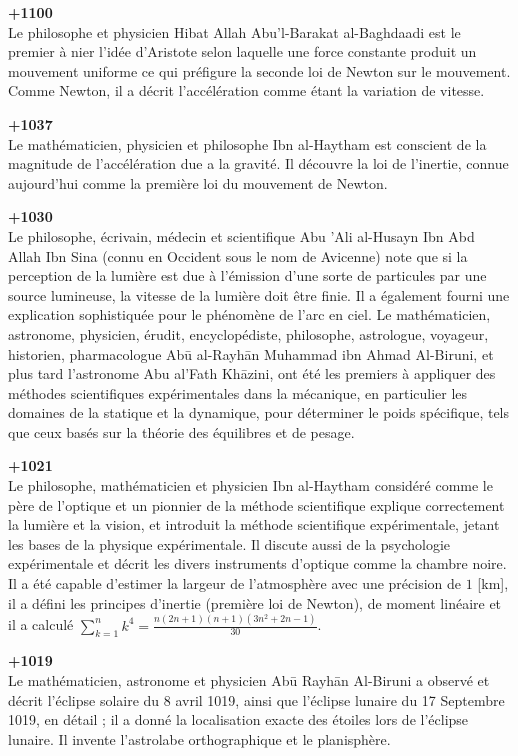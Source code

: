\textbf{+1100}\\
Le philosophe et physicien Hibat Allah Abu'l-Barakat al-Baghdaadi est le premier à nier l'idée d'Aristote selon laquelle une force constante produit un mouvement uniforme ce qui préfigure la seconde loi de Newton sur le mouvement. Comme Newton, il a décrit l'accélération comme étant la variation de vitesse.

\textbf{+1037}\\
Le mathématicien, physicien et philosophe Ibn al-Haytham est conscient de la magnitude de l'accélération due a la gravité. Il découvre la loi de l'inertie, connue aujourd'hui comme la première loi du mouvement de Newton.

\textbf{+1030}\\
Le philosophe, écrivain, médecin et scientifique Abu 'Ali al-Husayn Ibn Abd Allah Ibn Sina (connu en Occident sous le nom de Avicenne) note que si la perception de la lumière est due à l'émission d'une sorte de particules par une source lumineuse, la vitesse de la lumière doit être finie. Il a également fourni une explication sophistiquée pour le phénomène de l'arc en ciel.  Le mathématicien, astronome, physicien, érudit, encyclopédiste, philosophe, astrologue, voyageur, historien, pharmacologue Abū al-Rayhān Muhammad ibn Ahmad  Al-Biruni, et plus tard l'astronome Abu al'Fath Khāzini, ont été les premiers à appliquer des méthodes scientifiques expérimentales dans la mécanique, en particulier les domaines de la statique et la dynamique, pour déterminer le poids spécifique, tels que ceux basés sur la théorie des équilibres et de pesage.

\textbf{+1021}\\
Le philosophe, mathématicien et physicien Ibn al-Haytham considéré comme le père de l'optique et un pionnier de la méthode scientifique explique correctement la lumière et la vision, et introduit la méthode scientifique expérimentale, jetant les bases de la physique expérimentale. Il discute aussi de la psychologie expérimentale et décrit les divers instruments d'optique comme la chambre noire. Il a été capable d'estimer la largeur de l'atmosphère avec une précision de $1$ [km], il a défini les principes d'inertie (première loi de Newton), de moment linéaire et il a calculé $\sum_ {k = 1}^n k^4=\frac{n(2n+1)(n+1)(3n^2+2n-1)}{30}$.

\textbf{+1019}\\
Le mathématicien, astronome et physicien Abū Rayhān Al-Biruni a observé et décrit l'éclipse solaire du 8 avril 1019, ainsi que l'éclipse lunaire du 17 Septembre 1019, en détail ; il a donné la localisation exacte des étoiles lors de l'éclipse lunaire. Il invente l'astrolabe orthographique et le planisphère.

